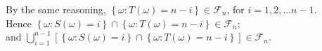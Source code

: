 \documentclass[11pt]{article} %
\begin{document}
By the same reasoning, $\left\lbrace \omega : T(\omega)=n-i \right\rbrace \in \mathcal{F}_{n}$, for $i=1,2,... n-1$. \\

Hence $\left\lbrace \omega : S(\omega)=i \right\rbrace \cap \left\lbrace \omega : T(\omega)=n-i\right\rbrace \in \mathcal{F}_{n}$;\\ and $\displaystyle \bigcup_{i=1}^{n-1}\left[ \left\lbrace \omega : S(\omega)=i\right\rbrace \cap \left\lbrace \omega : T(\omega)=n-i\right\rbrace \right] \in \mathcal{F}_{n}$.

\clearpage


\end{document}
